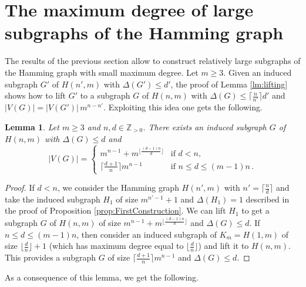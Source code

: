 \documentclass[a4paper,10pt]{amsart}
\newtheorem{lem}[thm]{Lemma}
\begin{document}
\section{The maximum degree of large subgraphs of the Hamming graph}\label{sec:large}

The results of the previous section allow to construct relatively large subgraphs of the Hamming graph with small maximum degree.
Let $m\geq 3$. Given an induced subgraph $G'$ of $H(n',m)$ with $\Delta(G') \leq d'$, the proof of Lemma \ref{lm:lifting} shows how to lift $G'$ to a subgraph $G$ of $H(n,m)$ with $\Delta(G) \leq \lceil\frac{n}{n'}\rceil d'$ and $|V(G)| = |V(G')|\, m^{n-n'}$. Exploiting this idea one gets the following.

\begin{lem}\label{lem:ubprevio}
    Let $m\geq 3$ and $n,d\in\mathbb Z_{> 0}$. There exists an induced subgraph $G$ of $H(n,m)$ with $\Delta(G)\leq d$ and \[|V(G)| = \begin{cases}  m^{n-1} + m^{\lfloor \frac{(d-1)n}{d} \rfloor} & \text{if } d<n,\\
\lceil \frac{d+1}{n} \rceil  m^{n-1}& \text{if } n\leq d\leq (m-1)n\, . \end{cases}  \]
\end{lem}
\begin{proof} If $d < n$, we consider the Hamming graph  $H(n',m)$ with $n' = \lceil \frac{n}{d} \rceil$  and take the induced subgraph $H_1$ of size $m^{n'-1}+1$ and $\Delta(H_1)=1$ described in the proof of Proposition \ref{prop:FirstConstruction}. We can lift $H_1$ to get a subgraph $G$ of $H(n,m)$  of size $m^{n-1} + m^{\lfloor \frac{(d-1)n}{d} \rfloor}$ and $\Delta(G) \leq d$. If $n \leq d \leq (m-1)n$, then consider an induced subgraph of $K_m = H(1,m)$ of size $\lfloor \frac{d}{n}\rfloor+1$ (which has maximum degree equal to $\lfloor \frac{d}{n}\rfloor$) and lift it to $H(n,m)$. This provides a subgraph $G$ of size $\lceil \frac{d+1}{n} \rceil  m^{n-1}$ and $\Delta(G) \leq d$.
\end{proof}

 As a consequence of this lemma, we get the following.
\end{document}
